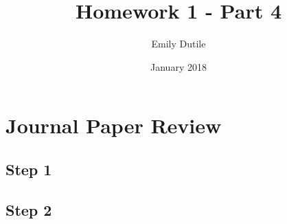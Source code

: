 \documentclass{neu_handout}
\title{Homework 1 - Part 4}
\author{Emily Dutile}
\date{January 2018}
\begin{document}
\section*{Journal Paper Review}

\subsection*{Step 1}

\subsection*{Step 2}
\end{document}
